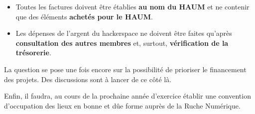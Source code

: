 \documentclass[a4paper, 11pt]{article}
\begin{document}
\begin{itemize}
	\item Toutes les factures doivent être établies \textbf{au nom du HAUM} et ne contenir que des éléments
		\textbf{achetés pour le HAUM}. 
	\item Les dépenses de l'argent du hackerspace ne doivent être faites qu'après \textbf{consultation des autres
		membres} et, surtout, \textbf{vérification de la trésorerie}.
\end{itemize}

La question se pose une fois encore sur la possibilité de prioriser le financement des projets. Des discussions sont à
lancer de ce côté là.

Enfin, il faudra, au cours de la prochaine année d'exercice établir une convention d'occupation des lieux en bonne et dûe
forme auprès de la Ruche Numérique.
\end{document}
